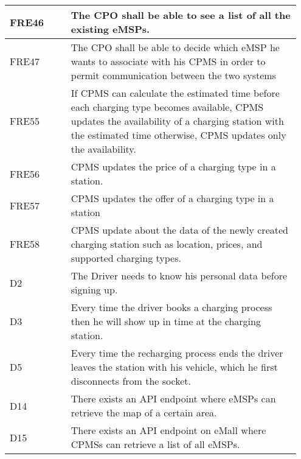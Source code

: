 {\begin{longtable}{|p{0.20\linewidth}p{0.75\linewidth}|}
    \hline
    \rowcolor{bluepoli!15}
    FRE46 & The CPO shall be able to see a list of all the existing eMSPs. \\
    \hline
    \rowcolor{bluepoli!15} FRE47 & The CPO shall be able to decide which eMSP he wants to associate with his CPMS in order to permit communication between the two systems \\
    \hline
    \rowcolor{bluepoli!15} FRE55 & If CPMS can calculate the estimated time before each charging type becomes available, CPMS updates the availability of a charging station with the estimated time otherwise, CPMS updates only the availability. \\
    \hline
    \rowcolor{bluepoli!15} FRE56 & CPMS updates the price of a charging type in a station. \\
    \hline  
    \rowcolor{bluepoli!15} FRE57 & CPMS updates the offer of a charging type in a station \\
    \hline  
     \rowcolor{bluepoli!15}
     FRE58 & CPMS update about the data of the newly created charging station such as location, prices, and supported charging types. \\
     \hline
    \rowcolor{bluepoli!5} D2 & The Driver needs to know his personal data before signing up.  \\
    \hline
    \rowcolor{bluepoli!5} D3 & Every time the driver books a charging process then he will show up in time at the charging station. \\
    \hline   
    \rowcolor{bluepoli!5} D5 & Every time the recharging process ends the driver leaves the station with his vehicle, which he first disconnects from the socket. \\
    \hline  
    \rowcolor{bluepoli!5} D14 & There exists an API endpoint where eMSPs can retrieve the map of a certain area.\\
    \hline 
    \rowcolor{bluepoli!5} D15 & There exists an API endpoint on eMall where CPMSs can retrieve a list of all eMSPs.\\
    \hline 
\end{longtable}}
